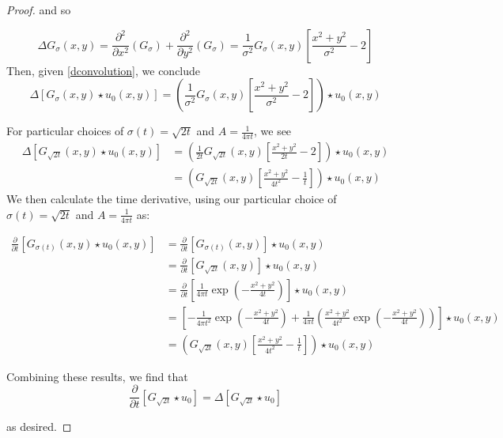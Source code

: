 \begin{proof}
	and so
	
	\begin{equation}
	\Delta G_\sigma(x,y) =
		\frac{\partial^2}{\partial x^2} \left(G_{\sigma}\right)
		+ \frac{\partial^2}{\partial y^2} \left(G_{\sigma}\right)
		= \frac{1}{\sigma^2} G_\sigma(x,y) \left[ \frac{x^2 + y^2}{\sigma^2} - 2\right] 
	\end{equation}
	Then, given \cref{dconvolution}, we conclude
	\begin{equation}
	\Delta \left[ G_\sigma(x,y) \star u_0(x,y) \right] 
	= \left(\frac{1}{\sigma^2} G_\sigma(x,y) \left[ \frac{x^2 + y^2}{\sigma^2} - 2\right]\right) \star u_0(x,y)
	\end{equation}
	
	For particular choices of $\sigma(t) = \sqrt{2t}$ and $A = \frac{1}{4\pi t}$,
	we see 
	\begin{align}
		\Delta \left[ G_{\sqrt{2t}}(x,y) \star u_0(x,y) \right] 
		&= \left(\frac{1}{2t} G_{\sqrt{2t}}(x,y) \left[ \frac{x^2 + y^2}{2t} - 2\right]\right) \star u_0(x,y) \\
		&= \left(G_{\sqrt{2t}}(x,y) \left[ \frac{x^2 + y^2}{4t^2} - \frac{1}{t}\right]\right) \star u_0(x,y)
	\end{align}
	We then calculate the time derivative,
	using our particular choice of $\sigma(t) = \sqrt{2t}$ and $A = \frac{1}{4\pi t}$ as:
	
	\begin{align}
	\frac{\partial}{\partial t} \left[ G_{\sigma(t)}(x,y) \star u_0(x,y) \right]
	&= \frac{\partial}{\partial t} \left[ G_{\sigma(t)}(x,y) \right] \star u_0(x,y) \\
	&= \frac{\partial}{\partial t} \left[ G_{\sqrt{2t}}(x,y)\right] \star u_0(x,y) \\
	&= \frac{\partial}{\partial t} \left[
	\frac{1}{4\pi t} \exp\left(-\frac{x^2 + y^2}{4t}\right) \right] \star u_0(x,y) \\
	&= \left[ -\frac{1}{4\pi t^2} \exp\left(-\frac{x^2 + y^2}{4t}\right) + 
	\frac{1}{4\pi t}\left( \frac{x^2 + y^2}{4t^2} \exp\left(-\frac{x^2 + y^2}{4t}\right)\right)
		\right] \star u_0(x,y) \\
		&= \left(G_{\sqrt{2t}}(x,y) \left[ \frac{x^2 + y^2}{4t^2} -\frac{1}{t}\right]\right) \star u_0(x,y)
	\end{align}

	Combining these results, we find that
	\begin{equation}
	\frac{\partial}{\partial t} \left[ G_{\sqrt{2t}} \star u_0 \right]
	= \Delta \left[ G_{\sqrt{2t}} \star u_0 \right] 
	\end{equation}
	
	as desired. \end{proof}
\hrulefill
